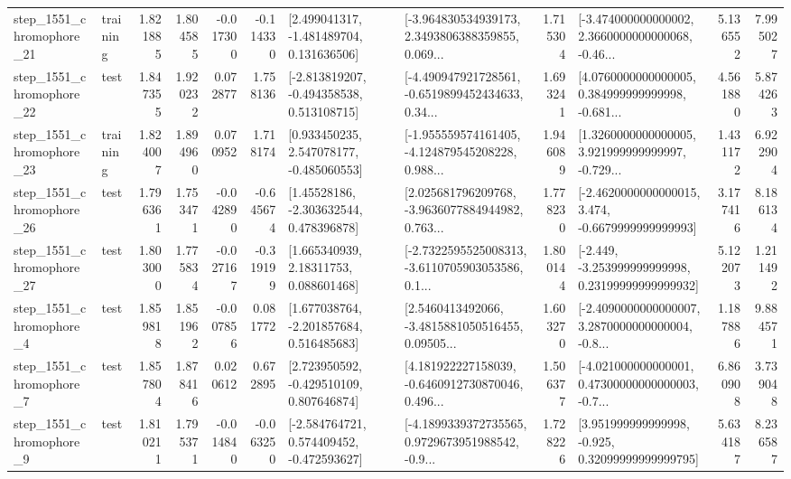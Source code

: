 \begin{tabular}{llrrrrllrlrr}
 step\_1551\_chromophore\_21 &  training &      1.821885 &    1.804585 &     -0.017300 & -0.114330 &    [2.499041317, -1.481489704, 0.131636506] &  [-3.964830534939173, 2.3493806388359855, 0.069... &       1.715304 &  [-3.474000000000002, 2.3660000000000068, -0.46... &            5.136552 &          7.995027 \\
 step\_1551\_chromophore\_22 &      test &      1.847355 &    1.920232 &      0.072877 &  1.758136 &   [-2.813819207, -0.494358538, 0.513108715] &  [-4.490947921728561, -0.6519899452434633, 0.34... &       1.693241 &  [4.0760000000000005, 0.384999999999998, -0.681... &            4.561880 &          5.874263 \\
 step\_1551\_chromophore\_23 &  training &      1.824007 &    1.894960 &      0.070952 &  1.718174 &    [0.933450235, 2.547078177, -0.485060553] &  [-1.955559574161405, -4.124879545208228, 0.988... &       1.946089 &  [1.3260000000000005, 3.921999999999997, -0.729... &            1.431172 &          6.922904 \\
 step\_1551\_chromophore\_26 &      test &      1.796361 &    1.753471 &     -0.042890 & -0.645674 &     [1.45528186, -2.303632544, 0.478396878] &  [2.025681796209768, -3.9636077884944982, 0.763... &       1.778230 &  [-2.4620000000000015, 3.474, -0.6679999999999993] &            3.177416 &          8.186134 \\
 step\_1551\_chromophore\_27 &      test &      1.803000 &    1.775834 &     -0.027167 & -0.319199 &      [1.665340939, 2.18311753, 0.088601468] &  [-2.7322595525008313, -3.6110705903053586, 0.1... &       1.800144 &  [-2.449, -3.253999999999998, 0.23199999999999932] &            5.122073 &          1.211492 \\
  step\_1551\_chromophore\_4 &      test &      1.859818 &    1.851962 &     -0.007856 &  0.081772 &    [1.677038764, -2.201857684, 0.516485683] &  [2.5460413492066, -3.4815881050516455, 0.09505... &       1.603270 &  [-2.4090000000000007, 3.2870000000000004, -0.8... &            1.187886 &          9.884571 \\
  step\_1551\_chromophore\_7 &      test &      1.857804 &    1.878416 &      0.020612 &  0.672895 &    [2.723950592, -0.429510109, 0.807646874] &  [4.181922227158039, -0.6460912730870046, 0.496... &       1.506377 &  [-4.021000000000001, 0.47300000000000003, -0.7... &            6.860908 &          3.739048 \\
  step\_1551\_chromophore\_9 &      test &      1.810211 &    1.795371 &     -0.014840 & -0.063250 &   [-2.584764721, 0.574409452, -0.472593627] &  [-4.1899339372735565, 0.9729673951988542, -0.9... &       1.728226 &   [3.951999999999998, -0.925, 0.32099999999999795] &            5.634187 &          8.236587 \\

\end{tabular}
